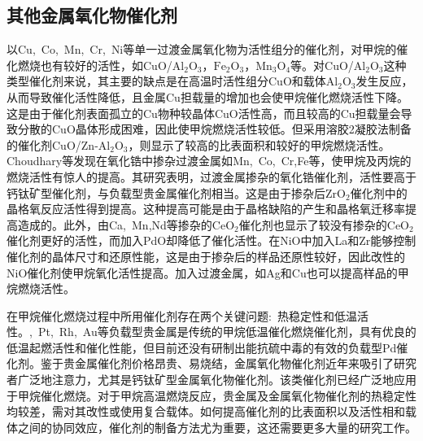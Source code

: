 \subsection{其他金属氧化物催化剂}
以\textrm{Cu},~\textrm{Co},~\textrm{Mn},~\textrm{Cr},~\textrm{Ni}等单一过渡金属氧化物为活性组分的催化剂，对甲烷的催化燃烧也有较好的活性，如\textrm{CuO}/$\mathrm{Al}_2\mathrm{O}_3$，$\mathrm{Fe}_2\mathrm{O}_3$，$\mathrm{Mn}_3\mathrm{O}_4$等。对\textrm{CuO}/$\mathrm{Al}_2\mathrm{O}_3$这种类型催化剂来说，其主要的缺点是在高温时活性组分\textrm{CuO}和载体$\mathrm{Al}_2\mathrm{O}_3$发生反应，从而导致催化活性降低，且金属\textrm{Cu}担载量的增加也会使甲烷催化燃烧活性下降。这是由于催化剂表面孤立的\textrm{Cu}物种较晶体\textrm{CuO}活性高，而且较高的\textrm{Cu}担载量会导致分散的\textrm{CuO}晶体形成困难，因此使甲烷燃烧活性较低。但采用溶胶2凝胶法制备的催化剂\textrm{CuO}/\textrm{Zn}-$\mathrm{Al}_2\mathrm{O}_3$，则显示了较高的比表面积和较好的甲烷燃烧活性。\textrm{Choudhary}等发现在氧化锆中掺杂过渡金属如\textrm{Mn},~\textrm{Co},~\textrm{Cr},\textrm{Fe}等，使甲烷及丙烷的燃烧活性有惊人的提高。其研究表明，过渡金属掺杂的氧化锆催化剂，活性要高于钙钛矿型催化剂，与负载型贵金属催化剂相当。这是由于掺杂后$\mathrm{ZrO}_2$催化剂中的晶格氧反应活性得到提高。这种提高可能是由于晶格\cite{ACA253-65_2003}缺陷的产生和晶格氧迁移率提高造成的。此外，由\textrm{Ca},~\textrm{Mn},\textrm{Nd}等掺杂的$\mathrm{CeO}_2$催化剂也显示了较没有掺杂的$\mathrm{CeO}_2$催化剂更好的活性，而加入\textrm{PdO}却降低了催化活性。在\textrm{NiO}中加入\textrm{La}和\textrm{Zr}能够控制催化剂的晶体尺寸和还原性能，这是由于掺杂后的样品还原性较好，因此改性的\textrm{NiO}催化剂使甲烷氧化活性提高。加入过渡金属，如\textrm{Ag}和\textrm{Cu}也可以提高样品的甲烷燃烧活性。

在甲烷催化燃烧过程中所用催化剂存在两个关键问题:~热稳定性和低温活性。,~\textrm{Pt},~\textrm{Rh},~\textrm{Au}等负载型贵金属是传统的甲烷低温催化燃烧催化剂，具有优良的低温起燃活性和催化性能，但目前还没有研制出能抗硫中毒的有效的负载型Pd催化剂。鉴于贵金属催化剂价格昂贵、易烧结，金属氧化物催化剂近年来吸引了研究者广泛地注意力，尤其是钙钛矿型金属氧化物催化剂。该类催化剂已经广泛地应用于甲烷催化燃烧。对于甲烷高温燃烧反应，贵金属及金属氧化物催化剂的热稳定性均较差，需对其改性或使用复合载体。如何提高催化剂的比表面积以及活性相和载体之间的协同效应，催化剂的制备方法尤为重要，这还需要更多大量的研究工作。
